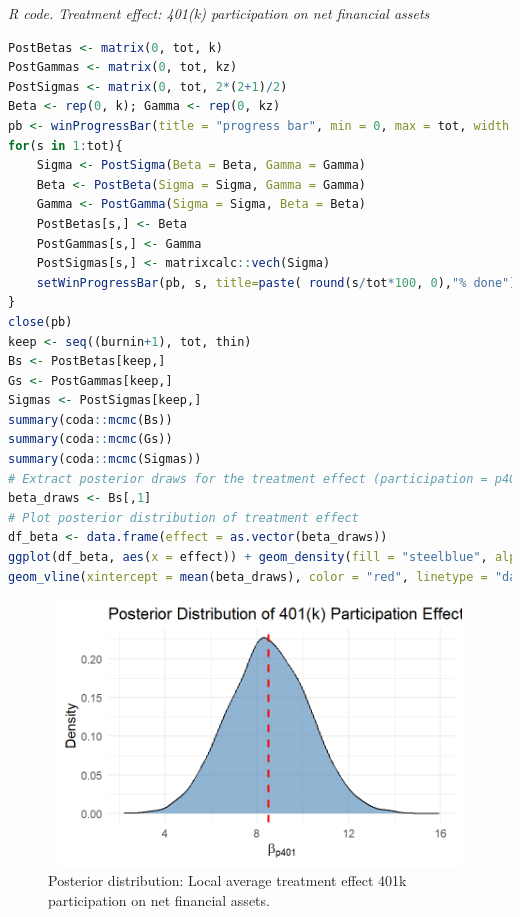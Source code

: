 \begin{tcolorbox}[enhanced,width=4.67in,center upper,
	fontupper=\large\bfseries,drop shadow southwest,sharp corners]\label{code3_chap12}
	\textit{R code. Treatment effect: 401(k) participation on net financial assets}
	\begin{VF}
		\begin{lstlisting}[language=R]		
PostBetas <- matrix(0, tot, k)
PostGammas <- matrix(0, tot, kz)
PostSigmas <- matrix(0, tot, 2*(2+1)/2)
Beta <- rep(0, k); Gamma <- rep(0, kz)
pb <- winProgressBar(title = "progress bar", min = 0, max = tot, width = 300)
for(s in 1:tot){
	Sigma <- PostSigma(Beta = Beta, Gamma = Gamma)
	Beta <- PostBeta(Sigma = Sigma, Gamma = Gamma)
	Gamma <- PostGamma(Sigma = Sigma, Beta = Beta)
	PostBetas[s,] <- Beta
	PostGammas[s,] <- Gamma
	PostSigmas[s,] <- matrixcalc::vech(Sigma)
	setWinProgressBar(pb, s, title=paste( round(s/tot*100, 0),"% done"))
}
close(pb)
keep <- seq((burnin+1), tot, thin)
Bs <- PostBetas[keep,]
Gs <- PostGammas[keep,]
Sigmas <- PostSigmas[keep,]
summary(coda::mcmc(Bs))
summary(coda::mcmc(Gs))
summary(coda::mcmc(Sigmas))
# Extract posterior draws for the treatment effect (participation = p401)
beta_draws <- Bs[,1]
# Plot posterior distribution of treatment effect
df_beta <- data.frame(effect = as.vector(beta_draws))
ggplot(df_beta, aes(x = effect)) + geom_density(fill = "steelblue", alpha = 0.6) +
geom_vline(xintercept = mean(beta_draws), color = "red", linetype = "dashed", linewidth = 1) + labs( title = "Posterior Distribution of 401(k) Participation Effect", x = expression(beta["p401"]), y = "Density") + theme_minimal(base_size = 14)
\end{lstlisting}
	\end{VF}
\end{tcolorbox}  
 
\begin{figure}[h!]
	\includegraphics[width=340pt, height=200pt]{Chapters/chapter12/figures/FigP401k.png}
	\caption[List of figure caption goes here]{Posterior distribution: Local average treatment effect 401k participation on net financial assets.}\label{fig12_3}
\end{figure}

